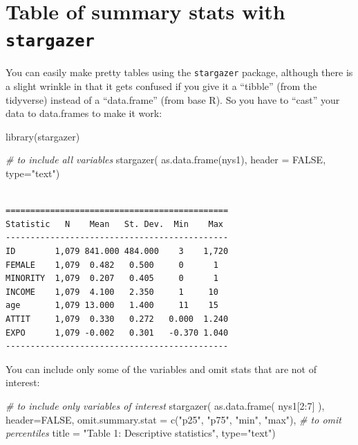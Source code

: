 \documentclass[
  letterpaper,
  DIV=11,
  numbers=noendperiod]{scrreprt}
\newenvironment{Shaded}{}{}
\newcommand{\AttributeTok}[1]{\textcolor[rgb]{0.49,0.56,0.16}{#1}}
\newcommand{\CommentTok}[1]{\textcolor[rgb]{0.38,0.63,0.69}{\textit{#1}}}
\newcommand{\ConstantTok}[1]{\textcolor[rgb]{0.53,0.00,0.00}{#1}}
\newcommand{\DecValTok}[1]{\textcolor[rgb]{0.25,0.63,0.44}{#1}}
\newcommand{\FunctionTok}[1]{\textcolor[rgb]{0.02,0.16,0.49}{#1}}
\newcommand{\NormalTok}[1]{#1}
\newcommand{\SpecialCharTok}[1]{\textcolor[rgb]{0.25,0.44,0.63}{#1}}
\newcommand{\StringTok}[1]{\textcolor[rgb]{0.25,0.44,0.63}{#1}}
\begin{document}
\section{\texorpdfstring{Table of summary stats with
\texttt{stargazer}}{Table of summary stats with stargazer}}\label{table-of-summary-stats-with-stargazer}

You can easily make pretty tables using the \texttt{stargazer} package,
although there is a slight wrinkle in that it gets confused if you give
it a ``tibble'' (from the tidyverse) instead of a ``data.frame'' (from
base R). So you have to ``cast'' your data to data.frames to make it
work:

\begin{Shaded}
\begin{Highlighting}[]
  \FunctionTok{library}\NormalTok{(stargazer)}
  
  \CommentTok{\# to include all variables}
  \FunctionTok{stargazer}\NormalTok{( }\FunctionTok{as.data.frame}\NormalTok{(nys1), }\AttributeTok{header =} \ConstantTok{FALSE}\NormalTok{, }\AttributeTok{type=}\StringTok{"text"}\NormalTok{)}
\end{Highlighting}
\end{Shaded}

\begin{verbatim}

=============================================
Statistic   N    Mean   St. Dev.  Min    Max 
---------------------------------------------
ID        1,079 841.000 484.000    3    1,720
FEMALE    1,079  0.482   0.500     0      1  
MINORITY  1,079  0.207   0.405     0      1  
INCOME    1,079  4.100   2.350     1     10  
age       1,079 13.000   1.400     11    15  
ATTIT     1,079  0.330   0.272   0.000  1.240
EXPO      1,079 -0.002   0.301   -0.370 1.040
---------------------------------------------
\end{verbatim}

You can include only some of the variables and omit stats that are not
of interest:

\begin{Shaded}
\begin{Highlighting}[]
\CommentTok{\# to include only variables of interest}
  \FunctionTok{stargazer}\NormalTok{( }\FunctionTok{as.data.frame}\NormalTok{( nys1[}\DecValTok{2}\SpecialCharTok{:}\DecValTok{7}\NormalTok{] ), }\AttributeTok{header=}\ConstantTok{FALSE}\NormalTok{, }
            \AttributeTok{omit.summary.stat =} \FunctionTok{c}\NormalTok{(}\StringTok{"p25"}\NormalTok{, }\StringTok{"p75"}\NormalTok{, }\StringTok{"min"}\NormalTok{, }\StringTok{"max"}\NormalTok{), }\CommentTok{\# to omit percentiles}
            \AttributeTok{title =} \StringTok{"Table 1: Descriptive statistics"}\NormalTok{,}
            \AttributeTok{type=}\StringTok{"text"}\NormalTok{)}
\end{Highlighting}
\end{Shaded}
\end{document}
